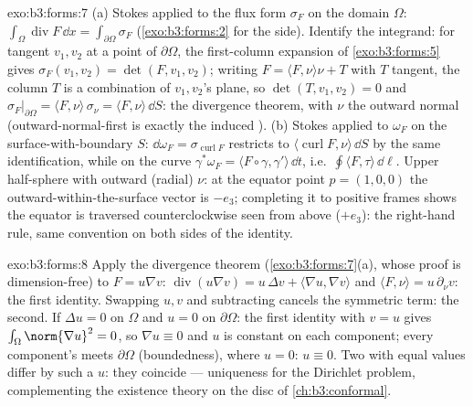 \begin{solution}{exo:b3:forms:7}
(a) Stokes applied to the flux form $\sigma_F$ on the
 domain $\Omega$:
$\int_\Omega\operatorname{div}F\,\dd x =
\int_{\partial\Omega}\sigma_F$ (\cref{exo:b3:forms:2} for
the  side). Identify the  integrand: for
tangent $v_1, v_2$ at a point of $\partial\Omega$, the
first-column expansion of \cref{exo:b3:forms:5} gives
$\sigma_F(v_1, v_2) = \det(F, v_1, v_2)$; writing $F =
\langle F, \nu\rangle\nu + T$ with $T$ tangent, the column
$T$ is a combination of $v_1, v_2$'s plane, so $\det(T,
v_1, v_2) = 0$ and
$\sigma_F\vert_{\partial\Omega} = \langle F,
\nu\rangle\,\sigma_\nu = \langle F, \nu\rangle\,\dd S$: the
divergence theorem, with $\nu$ the outward normal
(outward-normal-first is exactly the induced ).
(b) Stokes applied to $\omega_F$ on the
surface-with-boundary $S$: $\dd\omega_F =
\sigma_{\operatorname{curl}F}$ restricts to
$\langle\operatorname{curl}F, \nu\rangle\,\dd S$ by the same
identification, while on the  curve
$\gamma^*\omega_F = \langle F\circ\gamma,
\gamma'\rangle\,\dd t$, i.e.\ $\oint\langle F,
\tau\rangle\,\dd\ell$. Upper half-sphere with outward
(radial) $\nu$: at the equator point $p = (1,0,0)$ the
outward-within-the-surface vector is $-e_3$; completing it
to positive frames shows the equator is traversed
counterclockwise seen from above ($+e_3$): the right-hand
rule, same convention on both sides of the identity.
\end{solution}

\begin{solution}{exo:b3:forms:8}
Apply the divergence theorem (\cref{exo:b3:forms:7}(a),
whose proof is dimension-free) to $F = u\nabla v$:
$\operatorname{div}(u\nabla v) = u\,\Delta v + \langle\nabla
u, \nabla v\rangle$ and $\langle F, \nu\rangle =
u\,\partial_\nu v$: the first identity. Swapping $u, v$ and
subtracting cancels the symmetric term: the second. If
$\Delta u = 0$ on $\Omega$ and $u = 0$ on $\partial\Omega$:
the first identity with $v = u$ gives
$\int_\Omega\norm{\nabla u}^2 = 0$, so $\nabla u \equiv 0$
and $u$ is constant on each component; every component's
 meets $\partial\Omega$ (boundedness), where $u = 0$:
$u \equiv 0$. Two  with equal 
values differ by such a $u$: they coincide --- uniqueness
for the Dirichlet problem, complementing the existence
theory on the disc of \cref{ch:b3:conformal}.
\end{solution}


